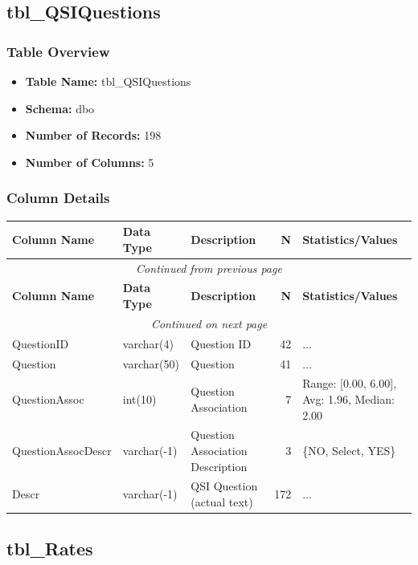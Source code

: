 \begin{landscape}
\subsection{tbl\_QSIQuestions}

\subsubsection{Table Overview}
\begin{itemize}
\item \textbf{Table Name:} tbl\_QSIQuestions
\item \textbf{Schema:} dbo
\item \textbf{Number of Records:} 198
\item \textbf{Number of Columns:} 5
\end{itemize}

\subsubsection{Column Details}
\begin{longtable}{|l|l|l|r|p{6cm}|}
\hline
\textbf{Column Name} & \textbf{Data Type} & \textbf{Description} & \textbf{N} & \textbf{Statistics/Values} \\
\hline
\endfirsthead
\multicolumn{5}{c}{\textit{Continued from previous page}} \\
\hline
\textbf{Column Name} & \textbf{Data Type} & \textbf{Description} & \textbf{N} & \textbf{Statistics/Values} \\
\hline
\endhead
\hline
\multicolumn{5}{c}{\textit{Continued on next page}} \\
\endfoot
\hline
\endlastfoot
QuestionID & varchar(4) & Question ID & 42 & ... \\
\hline
Question & varchar(50) & Question & 41 & ... \\
\hline
QuestionAssoc & int(10) & Question Association & 7 & Range: [0.00, 6.00], Avg: 1.96, Median: 2.00 \\
\hline
QuestionAssocDescr & varchar(-1) & Question Association Description & 3 & \{NO, Select, YES\} \\
\hline
Descr & varchar(-1) & QSI Question (actual text) & 172 & ... \\
\hline
\end{longtable}

\subsection{tbl\_Rates}


\end{landscape}
